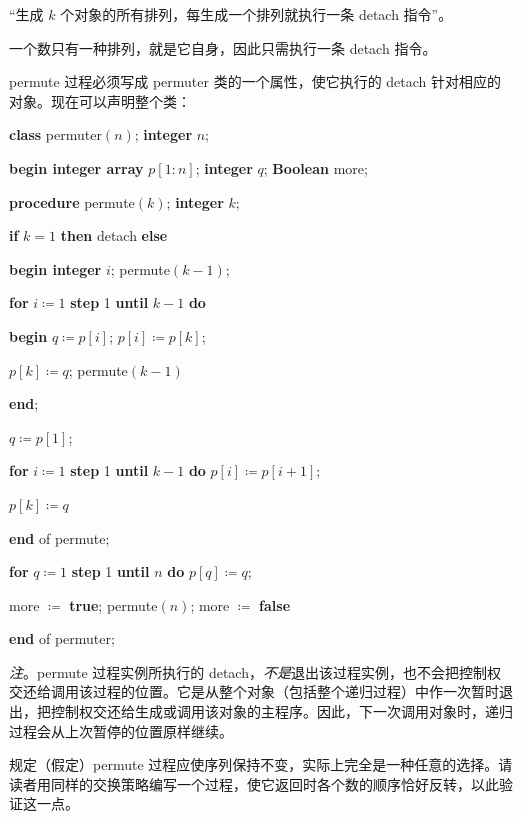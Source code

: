 \documentclass[twoside,11pt,fontset=none]{ctexbook}
\begin{document}
\parindent\quad “生成 $k$ 个对象的所有排列，每生成一个排列就执行一条 detach 指令”。

\noindent
一个数只有一种排列，就是它自身，因此只需执行一条 detach 指令。

permute 过程必须写成 permuter 类的一个属性，使它执行的 detach 针对相应的对象。现在可以声明整个类：

\quad \textbf{class} permuter$(n)$; \textbf{integer} $n$;

\quad \textbf{begin integer array} $p[1:n]$; \textbf{integer} $q$; \textbf{Boolean} more;

\quad \quad \textbf{procedure} permute$(k)$; \textbf{integer} $k$;

\quad \quad \textbf{if} $k = 1$ \textbf{then} detach \textbf{else}

\quad \quad \textbf{begin integer} $i$; permute$(k - 1)$;

\quad \quad \quad \textbf{for} $i\coloneq 1$ \textbf{step} 1 \textbf{until} $k - 1$ \textbf{do}

\quad \quad \quad \textbf{begin} $q\coloneq p[i]$; $p[i]\coloneq p[k]$;

\quad \quad \quad \quad $p[k]\coloneq q$; permute$(k - 1)$

\quad \quad \quad \textbf{end};

\quad \quad \quad $q\coloneq p[1]$;

\quad \quad \quad \textbf{for} $i\coloneq 1$ \textbf{step} 1 \textbf{until} $k - 1$ \textbf{do} $p[i] \coloneq p[i + 1]$;

\quad \quad \quad $p[k]\coloneq q$

\quad \quad \textbf{end} of permute;

\quad \quad \textbf{for} $q\coloneq 1$ \textbf{step} 1 \textbf{until} $n$ \textbf{do} $p[q] \coloneq q$;

\quad \quad \quad more $\coloneq$ \textbf{true}; permute$(n)$; more $\coloneq$ \textbf{false}

\quad \textbf{end} of permuter;

\textit{注}。permute 过程实例所执行的 detach，\textit{不是}退出该过程实例，也不会把控制权交还给调用该过程的位置。它是从整个对象（包括整个递归过程）中作一次暂时退出，把控制权交还给生成或调用该对象的主程序。因此，下一次调用对象时，递归过程会从上次暂停的位置原样继续。

规定（假定）permute 过程应使序列保持不变，实际上完全是一种任意的选择。请读者用同样的交换策略编写一个过程，使它返回时各个数的顺序恰好反转，以此验证这一点。
\end{document}
